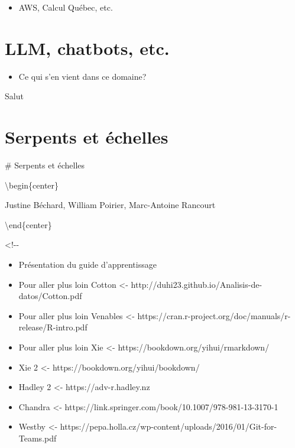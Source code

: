 \documentclass[
  letterpaper,
]{scrbook}
\providecommand{\tightlist}{%
  \setlength{\itemsep}{0pt}\setlength{\parskip}{0pt}}\usepackage{longtable,booktabs,array}
\begin{document}
\begin{itemize}
\tightlist
\item
  AWS, Calcul Québec, etc.
\end{itemize}


\hypertarget{llm-chatbots-etc.}{%
\chapter{LLM, chatbots, etc.}\label{llm-chatbots-etc.}}

\begin{itemize}
\tightlist
\item
  Ce qui s'en vient dans ce domaine?
\end{itemize}

Salut


\hypertarget{serpents-et-uxe9chelles}{%
\chapter{Serpents et échelles}\label{serpents-et-uxe9chelles}}

\# Serpents et échelles

\textbackslash begin\{center\}

Justine Béchard, William Poirier, Marc-Antoine Rancourt

\textbackslash end\{center\}

\textless!-\/-

\begin{itemize}
\item
  Présentation du guide d'apprentissage
\item
  Pour aller plus loin Cotton \textless-
  http://duhi23.github.io/Analisis-de-datos/Cotton.pdf
\item
  Pour aller plus loin Venables \textless-
  https://cran.r-project.org/doc/manuals/r-release/R-intro.pdf
\item
  Pour aller plus loin Xie \textless-
  https://bookdown.org/yihui/rmarkdown/
\item
  Xie 2 \textless- https://bookdown.org/yihui/bookdown/
\item
  Hadley 2 \textless- https://adv-r.hadley.nz
\item
  Chandra \textless-
  https://link.springer.com/book/10.1007/978-981-13-3170-1
\item
  Westby \textless-
  https://pepa.holla.cz/wp-content/uploads/2016/01/Git-for-Teams.pdf
\end{itemize}
\end{document}
